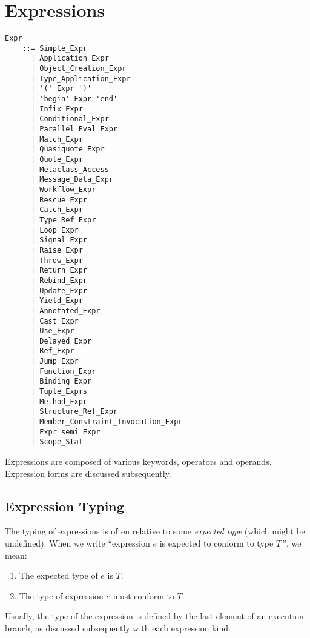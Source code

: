 
\chapter{Expressions}

\minitoc

\newpage

\grammar\begin{lstlisting}
Expr        
    ::= Simple_Expr
      | Application_Expr
      | Object_Creation_Expr
      | Type_Application_Expr
      | '(' Expr ')'
      | 'begin' Expr 'end'
      | Infix_Expr
      | Conditional_Expr
      | Parallel_Eval_Expr
      | Match_Expr
      | Quasiquote_Expr
      | Quote_Expr
      | Metaclass_Access
      | Message_Data_Expr
      | Workflow_Expr
      | Rescue_Expr
      | Catch_Expr
      | Type_Ref_Expr
      | Loop_Expr
      | Signal_Expr
      | Raise_Expr
      | Throw_Expr
      | Return_Expr
      | Rebind_Expr
      | Update_Expr
      | Yield_Expr
      | Annotated_Expr
      | Cast_Expr
      | Use_Expr
      | Delayed_Expr
      | Ref_Expr
      | Jump_Expr
      | Function_Expr
      | Binding_Expr
      | Tuple_Exprs
      | Method_Expr
      | Structure_Ref_Expr
      | Member_Constraint_Invocation_Expr
      | Expr semi Expr
      | Scope_Stat
\end{lstlisting}

Expressions are composed of various keywords, operators and operands. Expression forms are discussed subsequently. 







\section{Expression Typing}
\label{sec:expression-typing}

The typing of expressions is often relative to some {\em expected type} (which might be undefined). When we write ``expression $e$ is expected to conform to type $T$\,'', we mean:
\begin{enumerate}
  \item The expected type of $e$ is $T$.
  \item The type of expression $e$ must conform to $T$. 
\end{enumerate}

Usually, the type of the expression is defined by the last element of an execution branch, as discussed subsequently with each expression kind. 

